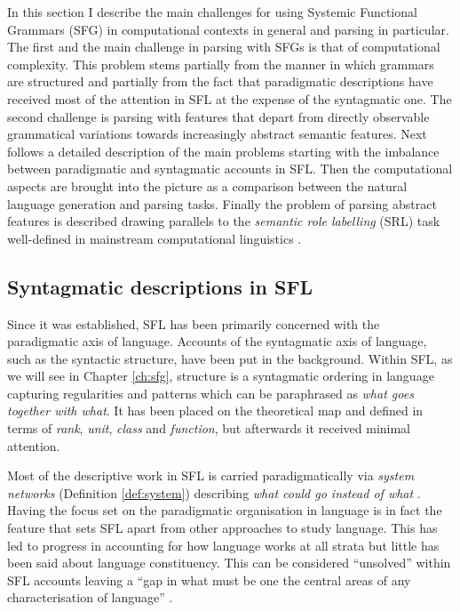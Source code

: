 In this section I describe the main challenges for using Systemic Functional Grammars (SFG) in computational contexts in general and parsing in particular. The first and the main challenge in parsing with SFGs is that of computational complexity. This problem stems partially from the manner in which grammars are structured and partially from the fact that paradigmatic descriptions have received most of the attention in SFL at the expense of the syntagmatic one. The second challenge is parsing with features that depart from directly observable grammatical variations towards increasingly abstract semantic features. 
Next follows a detailed description of the main problems starting with the imbalance between paradigmatic and syntagmatic accounts in SFL. Then the computational aspects are brought into the picture as a comparison between the natural language generation and parsing tasks. Finally the problem of parsing abstract features is described drawing parallels to the \textit{semantic role labelling} (SRL) task well-defined in mainstream computational linguistics \citep{Carreras2005}. 

\subsection{Syntagmatic descriptions in SFL}

Since it was established, SFL has been primarily concerned with the paradigmatic axis of language. Accounts of the syntagmatic axis of language, such as the syntactic structure, have been put in the background. Within SFL, as we will see in Chapter \ref{ch:sfg}, structure is a syntagmatic ordering in language capturing regularities and patterns which can be paraphrased as \textit{what goes together with what}. It has been placed on the theoretical map and defined in terms of \textit{rank}, \textit{unit}, \textit{class} and \textit{function}, but afterwards it received minimal attention.

Most of the descriptive work in SFL is carried paradigmatically via \textit{system networks} (Definition \ref{def:system}) describing \textit{what could go instead of what} \citep[22]{Halliday2013}. Having the focus set on the paradigmatic organisation in language is in fact the feature that sets SFL apart from other approaches to study language.
This has led to progress in accounting for how language works at all strata but little has been said about language constituency. This can be considered ``unsolved'' within SFL accounts leaving a ``gap in what must be one the central areas of any characterisation of language'' \citep[25]{Bateman2008}. 

